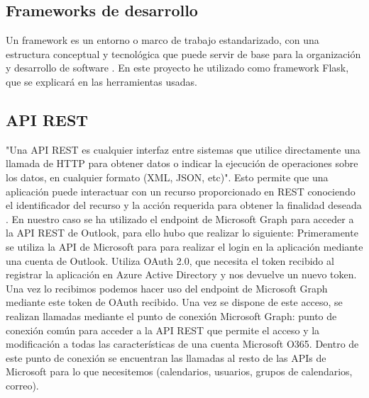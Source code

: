 
\subsection{Frameworks de desarrollo}
Un framework es un entorno o marco de trabajo estandarizado, con una estructura conceptual y tecnológica que puede servir de base para la organización y desarrollo de software \cite{wiki:framework}.\newline
En este proyecto he utilizado como framework Flask, que se explicará en las herramientas usadas.

\subsection{API REST}
"Una API REST es cualquier interfaz entre sistemas que utilice directamente una llamada de HTTP para obtener datos o indicar la ejecución de operaciones sobre los datos, en cualquier formato (XML, JSON, etc)". Esto permite que una aplicación puede interactuar con un recurso proporcionado en REST conociendo el identificador del recurso y la acción requerida para obtener la finalidad deseada \cite{wiki:REST}.\newline
En nuestro caso se ha utilizado el endpoint de Microsoft Graph para acceder a la API REST de Outlook, para ello hubo que realizar lo siguiente:\newline
Primeramente se utiliza la API de Microsoft para  para realizar el login en la aplicación mediante una cuenta de Outlook. Utiliza OAuth 2.0, que necesita el token recibido al registrar la aplicación en Azure Active Directory y nos devuelve un nuevo token. Una vez lo recibimos podemos hacer uso del endpoint de Microsoft Graph mediante este token de OAuth recibido.
\newline
Una vez se dispone de este acceso, se realizan llamadas mediante el punto de conexión Microsoft Graph: punto de conexión común para acceder a la API REST que permite el acceso y la modificación a todas las características de una cuenta Microsoft O365. Dentro de este punto de conexión se encuentran las llamadas al resto de las APIs de Microsoft para lo que necesitemos (calendarios, usuarios, grupos de calendarios, correo).


